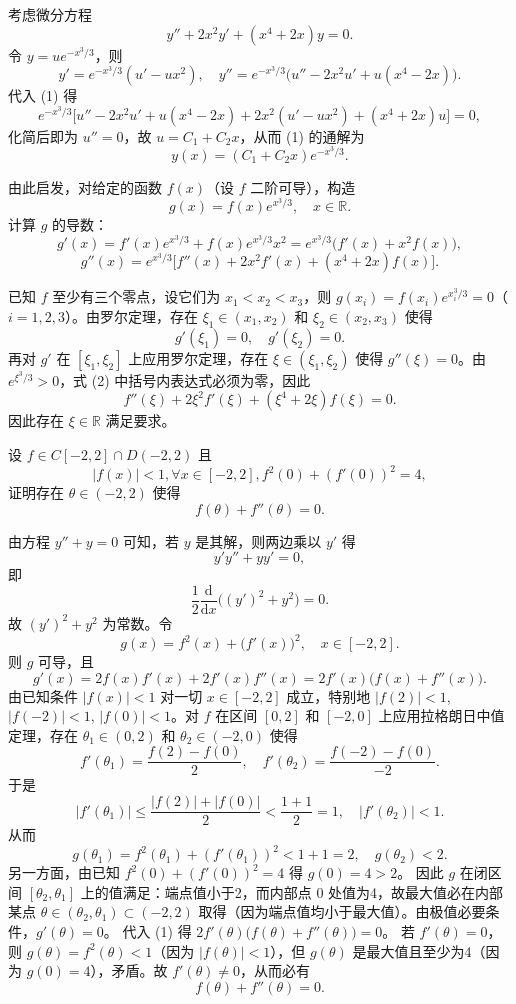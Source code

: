 \begin{solution}
考虑微分方程
\[
y'' + 2x^2 y' + (x^4 + 2x)y = 0. \tag{1}
\]
令 $y = u e^{-x^3/3}$，则
\[
y' = e^{-x^3/3}(u' - u x^2),\quad y'' = e^{-x^3/3}\bigl(u'' - 2x^2 u' + u(x^4 - 2x)\bigr).
\]
代入 (1) 得
\[
e^{-x^3/3}\bigl[u'' - 2x^2 u' + u(x^4 - 2x) + 2x^2(u' - u x^2) + (x^4 + 2x)u\bigr] = 0,
\]
化简后即为 $u'' = 0$，故 $u = C_1 + C_2 x$，从而 (1) 的通解为
\[
y(x) = (C_1 + C_2 x)e^{-x^3/3}.
\]

由此启发，对给定的函数 $f(x)$（设 $f$ 二阶可导），构造
\[
g(x) = f(x) e^{x^3/3},\quad x\in\mathbb{R}.
\]
计算 $g$ 的导数：
\[
g'(x) = f'(x)e^{x^3/3} + f(x)e^{x^3/3}x^2 = e^{x^3/3}\bigl(f'(x) + x^2 f(x)\bigr),
\]
\[
g''(x) = e^{x^3/3}\bigl[f''(x) + 2x^2 f'(x) + (x^4 + 2x)f(x)\bigr]. \tag{2}
\]

已知 $f$ 至少有三个零点，设它们为 $x_1 < x_2 < x_3$，则 $g(x_i)=f(x_i)e^{x_i^3/3}=0$（$i=1,2,3$）。由罗尔定理，存在 $\xi_1\in(x_1,x_2)$ 和 $\xi_2\in(x_2,x_3)$ 使得
\[
g'(\xi_1)=0,\quad g'(\xi_2)=0.
\]
再对 $g'$ 在 $[\xi_1,\xi_2]$ 上应用罗尔定理，存在 $\xi\in(\xi_1,\xi_2)$ 使得 $g''(\xi)=0$。由 $e^{\xi^3/3}>0$，式 (2) 中括号内表达式必须为零，因此
\[
f''(\xi) + 2\xi^2 f'(\xi) + (\xi^4 + 2\xi)f(\xi)=0.
\]
因此存在 $\xi\in\mathbb{R}$ 满足要求。
\end{solution}
\begin{example}[$f(\theta) + f''(\theta) = 0$]
设 $f \in C[-2,2] \cap D(-2,2)$ 且
$$|f(x)| < 1, \forall x \in [-2,2], f^2(0) + (f'(0))^2 = 4,$$
证明存在 $\theta \in (-2,2)$ 使得
$$f(\theta) + f''(\theta) = 0.$$
\end{example}
\begin{solution}
由方程 $y''+y=0$ 可知，若 $y$ 是其解，则两边乘以 $y'$ 得
\[
y'y''+yy'=0,
\]
即
\[
\frac{1}{2}\frac{\mathrm{d}}{\mathrm{d}x}\bigl((y')^2+y^2\bigr)=0.
\]
故 $(y')^2+y^2$ 为常数。令
\[
g(x)=f^2(x)+\bigl(f'(x)\bigr)^2,\quad x\in[-2,2].
\]
则 $g$ 可导，且
\[
g'(x)=2f(x)f'(x)+2f'(x)f''(x)=2f'(x)\bigl(f(x)+f''(x)\bigr). \tag{1}
\]
由已知条件 $|f(x)|<1$ 对一切 $x\in[-2,2]$ 成立，特别地 $|f(2)|<1$, $|f(-2)|<1$, $|f(0)|<1$。对 $f$ 在区间 $[0,2]$ 和 $[-2,0]$ 上应用拉格朗日中值定理，存在 $\theta_1\in(0,2)$ 和 $\theta_2\in(-2,0)$ 使得
\[
f'(\theta_1)=\frac{f(2)-f(0)}{2},\quad f'(\theta_2)=\frac{f(-2)-f(0)}{-2}.
\]
于是
\[
|f'(\theta_1)|\le\frac{|f(2)|+|f(0)|}{2}<\frac{1+1}{2}=1,\quad |f'(\theta_2)|<1.
\]
从而
\[
g(\theta_1)=f^2(\theta_1)+(f'(\theta_1))^2<1+1=2,\quad g(\theta_2)<2.
\]
另一方面，由已知 $f^2(0)+(f'(0))^2=4$ 得 $g(0)=4>2$。
因此 $g$ 在闭区间 $[\theta_2,\theta_1]$ 上的值满足：端点值小于2，而内部点 $0$ 处值为4，故最大值必在内部某点 $\theta\in(\theta_2,\theta_1)\subset(-2,2)$ 取得（因为端点值均小于最大值）。由极值必要条件，$g'(\theta)=0$。
代入 (1) 得 $2f'(\theta)\bigl(f(\theta)+f''(\theta)\bigr)=0$。
若 $f'(\theta)=0$，则 $g(\theta)=f^2(\theta)<1$（因为 $|f(\theta)|<1$），但 $g(\theta)$ 是最大值且至少为4（因为 $g(0)=4$），矛盾。故 $f'(\theta)\neq0$，从而必有
\[
f(\theta)+f''(\theta)=0.
\]
\end{solution}
